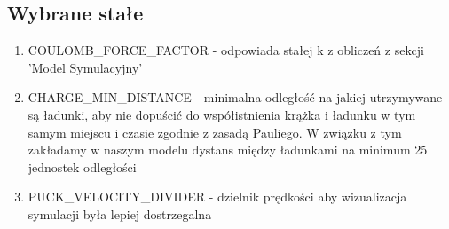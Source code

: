\documentclass{article}
\begin{document}
\subsection{Wybrane stałe}
\begin{enumerate}
    \item COULOMB\_FORCE\_FACTOR - odpowiada stałej k z obliczeń z sekcji 'Model Symulacyjny'
    \item CHARGE\_MIN\_DISTANCE - minimalna odległość na jakiej utrzymywane są ładunki, aby nie dopuścić do współistnienia krążka i ładunku w tym samym miejscu i czasie zgodnie z zasadą Pauliego. W związku z tym zakładamy w naszym modelu dystans między ładunkami na minimum 25 jednostek odległości
    \item PUCK\_VELOCITY\_DIVIDER - dzielnik prędkości aby wizualizacja symulacji była lepiej dostrzegalna
\end{enumerate}

\clearpage
\end{document}
